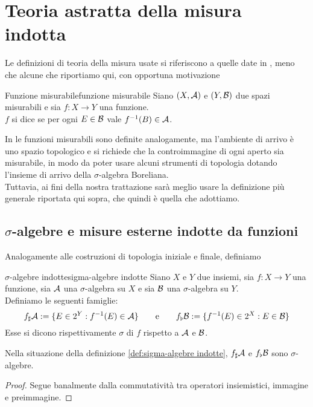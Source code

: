\documentclass{article}
\renewcommand\A{\mc{A}}
\begin{document}
\pagebreak
\section{Teoria astratta della misura indotta}

Le definizioni di teoria della misura usate si riferiscono a quelle date in \cite{Delladio2023}, meno che alcune che riportiamo qui, con opportuna motivazione

\begin{definition}{Funzione misurabile}{funzione misurabile}
    Siano $(X,\A)$ e $(Y,\mathcal{B})$ due spazi misurabili e sia $f : X\to Y$ una funzione.\\
    $f$ si dice  se per ogni $E \in \mathcal{B}$ vale $f^{-1}(B) \in \A$.
\end{definition}

In \cite{Delladio2023} le funzioni misurabili sono definite analogamente, ma l'ambiente di arrivo è uno spazio topologico e si richiede che la controimmagine di ogni aperto sia misurabile, in modo da poter usare alcuni strumenti di topologia dotando l'insieme di arrivo della $\sigma$-algebra Boreliana.\\
Tuttavia, ai fini della nostra trattazione sarà meglio usare la definizione più generale riportata qui sopra, che quindi è quella che adottiamo.

\subsection{$\sigma$-algebre e misure esterne indotte da funzioni}

Analogamente alle costruzioni di topologia iniziale e finale, definiamo 

\begin{definition}{$\sigma$-algebre indotte}{sigma-algebre indotte}
    Siano $X$ e $Y$ due insiemi, sia $f : X \to Y$ una funzione, sia $\A$ una $\sigma$-algebra su $X$ e sia $\mathcal{B}$ una $\sigma$-algebra su $Y$.\\
    Definiamo le seguenti famiglie:
    \[f_\sharp \A := \{E \in 2^Y : f^{-1}(E)\in \A\}\qquad \text{e}\qquad f_\flat\B := \{f^{-1}(E) \in 2^X : E \in \B \}\]
    Esse si dicono rispettivamente $\sigma$ di $f$ rispetto a $\A$ e $\mathcal{B}$.
\end{definition}

\begin{proposition}{}{}
    Nella situazione della definizione \ref{def:sigma-algebre indotte}, $f_\sharp\A$ e $f_\flat\mathcal{B}$ sono $\sigma$-algebre.
    \begin{proof}
        Segue banalmente dalla commutatività tra operatori insiemistici, immagine e preimmagine.
    \end{proof}
\end{proposition}
\end{document}
